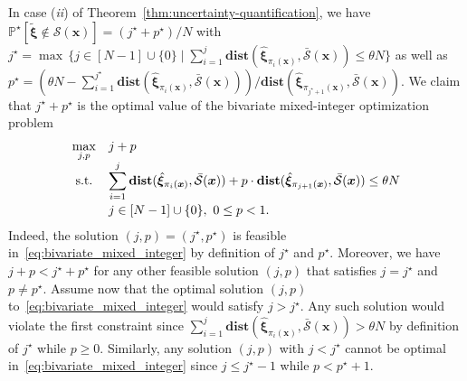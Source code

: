 \documentclass[nonblindrev]{informs2017}
\newcommand{\bmt}[1]{\tilde{\bm{#1}}}
\newcommand{\bmh}[1]{\hat{\bm{#1}}}
\newcommand{\1}[1]{\mathds{1}{\left(#1\right)}}
\begin{document}
In case (\emph{ii}) of Theorem~\ref{thm:uncertainty-quantification}, we have $\mathbb{P}^\star [\bmt{\xi} \notin \mathcal{S} (\bm{x})] = (j^\star+ p^\star)/N$ with $j^\star = \max \, \{j \in [N - 1] \cup \{0\} \mid \sum_{i = 1}^j \mathbf{dist}(\bmh{\xi}_{\pi_i (\bm{x})}, \bar{\mathcal{S}} (\bm{x})) \leq \theta N \}$ as well as $p^\star = (\theta N - \sum_{i = 1}^{j^\star} \mathbf{dist}(\bmh{\xi}_{\pi_i (\bm{x})}, \bar{\mathcal{S}} (\bm{x}))) / \mathbf{dist}(\bmh{\xi}_{\pi_{j^\star + 1} (\bm{x})}, \bar{\mathcal{S}} (\bm{x}))$. We claim that $j^\star+ p^\star$ is the optimal value of the bivariate mixed-integer optimization problem
\begin{equation}\label{eq:bivariate_mixed_integer}
\begin{array}{cll}
\displaystyle \max_{j, p} & \displaystyle j + p \\
{\rm s.t.} & \displaystyle  \sum_{i = 1}^{j} \mathbf{dist}(\bmh{\xi}_{\pi_i (\bm{x})}, \bar{\mathcal{S}} (\bm{x})) + p \cdot \mathbf{dist}(\bmh{\xi}_{\pi_{j + 1} (\bm{x})}, \bar{\mathcal{S}} (\bm{x})) \leq \theta N \\[4mm]
& \displaystyle j \in [N - 1] \cup \{0\},~0 \leq p < 1.
\end{array}
\end{equation}
Indeed, the solution $(j, p) = (j^\star, p^\star)$ is feasible in~\eqref{eq:bivariate_mixed_integer} by definition of $j^\star$ and $p^\star$. Moreover, we have $j + p < j^\star + p^\star$ for any other feasible solution $(j, p)$ that satisfies $j = j^\star$ and $p \neq p^\star$. Assume now that the optimal solution $(j, p)$ to~\eqref{eq:bivariate_mixed_integer} would satisfy $j > j^\star$. Any such solution would violate the first constraint since $\sum_{i = 1}^j \mathbf{dist}(\bmh{\xi}_{\pi_i (\bm{x})}, \bar{\mathcal{S}} (\bm{x})) > \theta N$ by definition of $j^\star$ while $p \geq 0$. Similarly, any solution $(j, p)$ with $j < j^\star$ cannot be optimal in~\eqref{eq:bivariate_mixed_integer} since $j \leq j^\star - 1$ while $p < p^\star + 1$.
\end{document}
